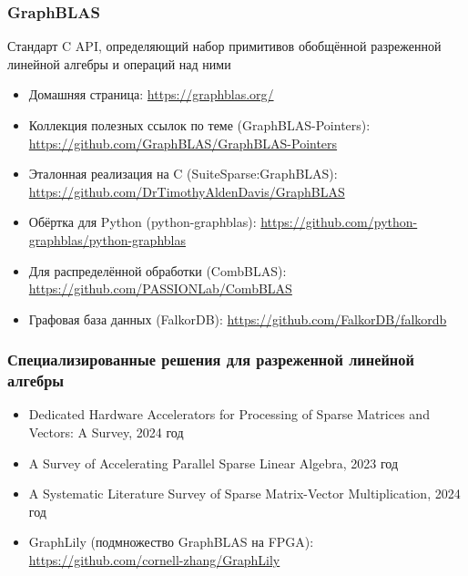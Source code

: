 \documentclass[xcolor=table,aspectratio=169]{beamer}
\begin{document}
\begin{frame}[fragile]
  \frametitle{GraphBLAS}
  Стандарт C API, определяющий набор примитивов обобщённой разреженной линейной алгебры и операций над ними  
  \begin{itemize}
    \item Домашняя страница: \href{https://graphblas.org/}{https://graphblas.org/} 
    \item Коллекция полезных ссылок по теме (GraphBLAS-Pointers): \href{https://github.com/GraphBLAS/GraphBLAS-Pointers}{https://github.com/GraphBLAS/GraphBLAS-Pointers}  
    \item Эталонная реализация на C (SuiteSparse:GraphBLAS): \href{https://github.com/DrTimothyAldenDavis/GraphBLAS}{https://github.com/DrTimothyAldenDavis/GraphBLAS} 
    \item Обёртка для Python (python-graphblas): \href{https://github.com/python-graphblas/python-graphblas}{https://github.com/python-graphblas/python-graphblas}
    \item Для распределённой обработки (CombBLAS): \href{https://github.com/PASSIONLab/CombBLAS}{https://github.com/PASSIONLab/CombBLAS}
    \item Графовая база данных (FalkorDB): \href{https://github.com/FalkorDB/falkordb}{https://github.com/FalkorDB/falkordb}
  \end{itemize}
\end{frame}

\begin{frame}[fragile]
  \frametitle{Специализированные решения для разреженной линейной алгебры}
  \begin{itemize}
    \item Dedicated Hardware Accelerators for Processing of Sparse Matrices and Vectors: A Survey, 2024 год
    \item A Survey of Accelerating Parallel Sparse Linear Algebra, 2023 год
    \item A Systematic Literature Survey of Sparse Matrix-Vector Multiplication, 2024 год
    \item GraphLily (подмножество GraphBLAS на FPGA): \href{https://github.com/cornell-zhang/GraphLily}{https://github.com/cornell-zhang/GraphLily}
  \end{itemize}
\end{frame}
\end{document}
